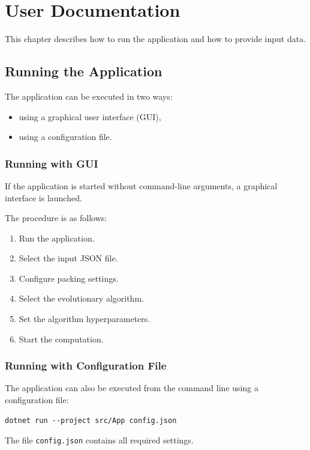 \chapter{User Documentation}
\label{app:user}

This chapter describes how to run the application and how to provide input data.

\section{Running the Application}

The application can be executed in two ways:
\begin{itemize}
    \item using a graphical user interface (GUI),
    \item using a configuration file.
\end{itemize}

\subsection{Running with GUI}

If the application is started without command-line arguments, a graphical interface is launched.

The procedure is as follows:
\begin{enumerate}
    \item Run the application.
    \item Select the input JSON file.
    \item Configure packing settings.
    \item Select the evolutionary algorithm.
    \item Set the algorithm hyperparameters.
    \item Start the computation.
\end{enumerate}

\subsection{Running with Configuration File}

The application can also be executed from the command line using a configuration file:

\begin{verbatim}
dotnet run --project src/App config.json
\end{verbatim}

The file \texttt{config.json} contains all required settings.

